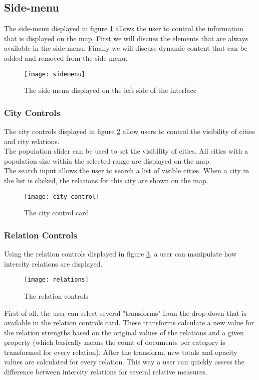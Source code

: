 \subsection{Side-menu}
The side-menu displayed in figure \ref{fig:sidemenu} allows the user to control the information that is displayed on the map. First we will discuss the elements that are always available in the side-menu. Finally we will discuss dynamic content that can be added and removed from the side-menu.

\begin{figure}[H]
    \centering
    \texttt{[image: sidemenu]}
    \caption{The side-menu displayed on the left side of the interface}
    \label{fig:sidemenu}
\end{figure}


\subsubsection{City Controls}
The city controls displayed in figure \ref{fig:city-control} allow users to control the visibility of cities and city relations.\\
The population slider can be used to set the visibility of cities. All cities with a population size within the selected range are displayed on the map.\\
The search input allows the user to search a list of visible cities. When a city in the list is clicked, the relations for this city are shown on the map.

\begin{figure}[H]
    \centering
    \texttt{[image: city-control]}
    \caption{The city control card}
    \label{fig:city-control}
\end{figure}

\subsubsection{Relation Controls}
Using the relation controls displayed in figure \ref{fig:relation-control}, a user can manipulate how intercity relations are displayed.\\

\begin{figure}[H]
    \centering
    \texttt{[image: relations]}
    \caption{The relation controls}
    \label{fig:relation-control}
\end{figure}

First of all, the user can select several "transforms" from the drop-down that is available in the relation controls card. These transforms calculate a new value for the relation strengths based on the original values of the relations and a given property (which basically means the count of documents per category is transformed for every relation). After the transform, new totals and opacity values are calculated for every relation. This way a user can quickly assess the difference between intercity relations for several relative measures.\\

